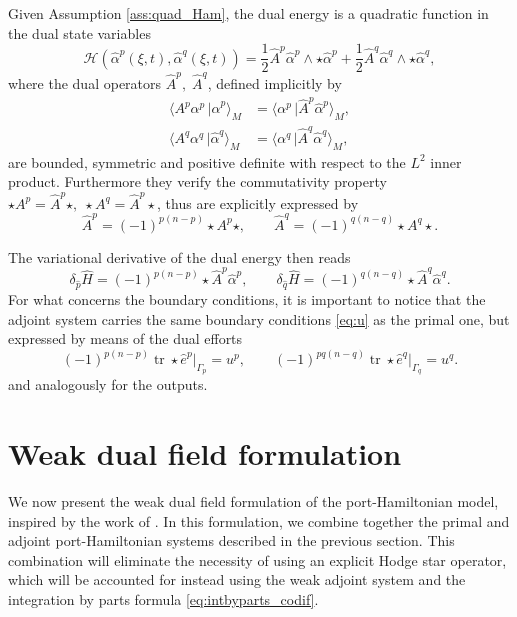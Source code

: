 \documentclass{elsarticle}
\DeclareMathOperator{\tr}{tr}
\newcommand*{\dual}[1]{\ensuremath{\widehat{#1}}}
\newcommand{\dualpr}[3][]{\ensuremath{\langle #2 \, \vert #3 \rangle_{#1}}}
\begin{document}
Given Assumption \ref{ass:quad_Ham}, the dual energy is a quadratic function in the dual state variables
\begin{equation*}
    \dual{\mathcal{H}}(\dual{\alpha}^p(\xi, t), \dual{\alpha}^q(\xi, t)) = \frac{1}{2} \dual{A}^p \dual{\alpha}^p \wedge \star \dual{\alpha}^p + \frac{1}{2} \dual{A}^q \dual{\alpha}^q \wedge \star  \dual{\alpha}^q,
\end{equation*}
where the dual operators $\dual{A}^p, \; \dual{A}^q$, defined implicitly by
\begin{equation}
\begin{aligned}
    \dualpr[M]{A^p\alpha^p}{\dual{\alpha}^p} &= \dualpr[M]{\alpha^p}{\dual{A}^p \dual{\alpha}^p}, \\
    \dualpr[M]{A^q\alpha^q}{\dual{\alpha}^q} &= \dualpr[M]{\alpha^q}{\dual{A}^q \dual{\alpha}^q},
\end{aligned}
\end{equation}
are bounded, symmetric and positive definite with respect to the $L^2$ inner product. Furthermore they verify the commutativity property $\star A^p = \dual{A}^p \star, \; \star A^q = \dual{A}^p \star$, thus are explicitly expressed by
\begin{equation}
    \dual{A}^p = (-1)^{p(n-p)} \star A^p \star, \qquad \dual{A}^q = (-1)^{q(n-q)} \star A^q \star.
\end{equation}

The variational derivative of the dual energy then reads
\begin{equation}
    \delta_{\dual{p}} \dual{H} = (-1)^{p(n-p)} \star  \dual{A}^p\dual{\alpha}^p, \qquad
    \delta_{\dual{q}} \dual{H} = (-1)^{q(n-q)} \star \dual{A}^q \dual{\alpha}^q.
\end{equation} 
For what concerns the boundary conditions, it is important to notice that the adjoint system carries the same boundary conditions \eqref{eq:u} as the primal one, but expressed by means of the dual efforts
 \begin{equation}
    (-1)^{p(n-p)}\tr\star \dual{e}^p \vert_{\Gamma_p} = u^p, \qquad
    (-1)^{pq(n-q)} \tr \star \dual{e}^q \vert_{\Gamma_q} = u^q.
 \end{equation}
and analogously for the outputs.

\section{Weak dual field formulation}\label{sec:weak_df}

We now present the weak dual field formulation of the port-Hamiltonian model, inspired by the work of \cite{zhang2021mass}. In this formulation, we combine together the primal and adjoint port-Hamiltonian systems described in the previous section. This combination will eliminate the necessity of using an explicit Hodge star operator, which will be accounted for instead using the weak adjoint system and the integration by parts formula \eqref{eq:intbyparts_codif}.
\end{document}
